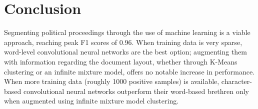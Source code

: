 \section{Conclusion}
Segmenting political proceedings through the use of machine learning is a viable
approach, reaching peak F1 scores of 0.96. When training data is very sparse,
word-level convolutional neural networks are the best option; augmenting them
with information regarding the document layout, whether through K-Means
clustering or an infinite mixture model, offers no notable increase in
performance. When more training data (roughly 1000 positive samples) is
available, character-based convolutional neural networks outperform their
word-based brethren only when augmented using infinite mixture model clustering.

